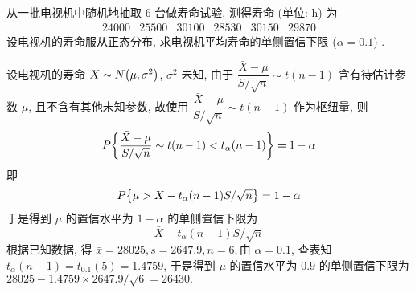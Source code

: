 \begin{example}
    从一批电视机中随机地抽取 $6$ 台做寿命试验, 测得寿命 (单位: h) 为
    $$\begin{array}{llllll}
            24000 & 25500 & 30100 & 28530 & 30150 & 29870
        \end{array}$$
    设电视机的寿命服从正态分布, 求电视机平均寿命的单侧置信下限 ($\alpha=0.1$) .
\end{example}
\begin{solution}
    设电视机的寿命 $X\sim N\qty(\mu,\sigma^2)$, $\sigma^2$ 未知, 由于 $\dfrac{\bar{X}-\mu}{S/\sqrt{n}}\sim t(n-1)$ 含有待估计参数 $\mu$, 且不含有其他未知参数, 故使用 $\dfrac{\bar{X}-\mu}{S/\sqrt{n}}\sim t(n-1)$ 作为枢纽量, 则 
    $$P\qty{\dfrac{\bar{X}-\mu}{S/\sqrt{n}}\sim t(n-1)<t_{\alpha}(n-1)}=1-\alpha$$
    即 
    $$P\qty{\mu>\bar{X}-t_{\alpha}(n-1)S/\sqrt{n}}=1-\alpha$$
    于是得到 $\mu$ 的置信水平为 $1-\alpha$ 的单侧置信下限为 $$\bar{X}-t_{\alpha}(n-1)S/\sqrt{n}$$
    根据已知数据, 得 $ \bar{x}=28025, s=2647.9, n=6 , $由 $ \alpha=0.1 $, 
    查表知 $ t_{\alpha}(n-1)=t_{0.1}(5)=  1.4759 $, 于是得到 $ \mu $ 的置信水平为 $0.9$ 的单侧置信下限为 $ 28025-1.4759 \times 2647.9 / \sqrt{6}=  26430.$
\end{solution}